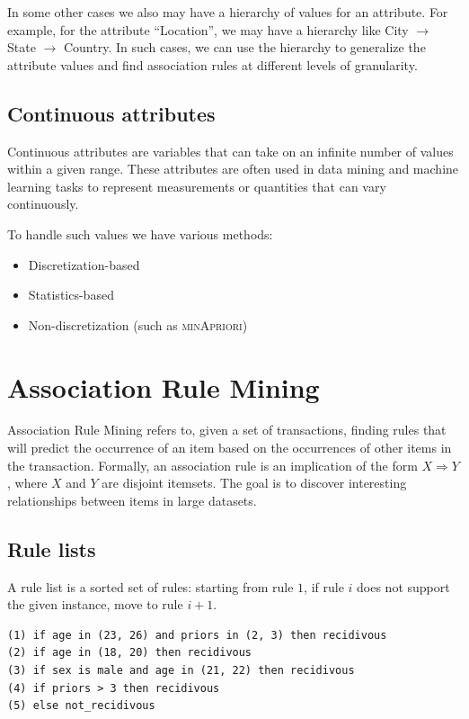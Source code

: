 In some other cases we also may have a hierarchy of values for an attribute. For example, for the attribute ``Location'', we may have a hierarchy like City $\rightarrow$ State $\rightarrow$ Country. In such cases, we can use the hierarchy to generalize the attribute values and find association rules at different levels of granularity.

\subsection{Continuous attributes}
Continuous attributes are variables that can take on an infinite number of values within a given range. These attributes are often used in data mining and machine learning tasks to represent measurements or quantities that can vary continuously.

To handle such values we have various methods:
\begin{itemize}
   \item Discretization-based
   \item Statistics-based
   \item Non-discretization (such as \textsc{minApriori})
\end{itemize}



\section{Association Rule Mining}
Association Rule Mining refers to, given a set of transactions, finding rules that will predict the occurrence of an item based on the occurrences of other items in the transaction. Formally, an association rule is an implication of the form $X \Rightarrow Y$, where $X$ and $Y$ are disjoint itemsets. The goal is to discover interesting relationships between items in large datasets.

\subsection{Rule lists}
 A rule list is a sorted set of rules: starting from rule $1$, if rule $i$ does not support the given instance, move to rule $i+1$.

 \lstset{language=python}
 \begin{lstlisting}
(1) if age in (23, 26) and priors in (2, 3) then recidivous
(2) if age in (18, 20) then recidivous
(3) if sex is male and age in (21, 22) then recidivous
(4) if priors > 3 then recidivous
(5) else not_recidivous
 \end{lstlisting}

